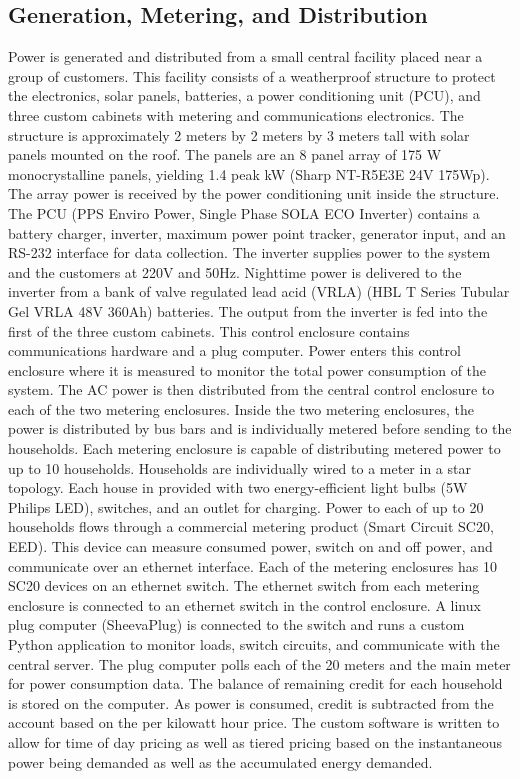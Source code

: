 \documentclass{sig-alternate}
\begin{document}
\subsection{Generation, Metering, and Distribution}
Power is generated and distributed from a small central facility placed
near a group of customers.
This facility consists of a weatherproof structure to protect the
electronics, solar panels, batteries, a power conditioning unit (PCU),
and three custom cabinets with metering and communications electronics.
The structure is approximately 2 meters by 2 meters by 3 meters tall
with solar panels mounted on the roof.
The panels are an 8 panel array of 175 W monocrystalline panels, yielding
1.4 peak kW (Sharp NT-R5E3E 24V 175Wp).
The array power is received by the power conditioning unit inside the
structure.
The PCU (PPS Enviro Power, Single Phase SOLA ECO Inverter) contains a
battery charger, inverter, maximum power point tracker, generator input,
and an RS-232 interface for data collection.
The inverter supplies power to the system and the customers at 220V and
50Hz.
Nighttime power is delivered to the inverter from a bank of valve
regulated lead acid (VRLA) (HBL T Series Tubular Gel VRLA 48V 360Ah)
batteries.
The output from the inverter is fed into the first of the three custom
cabinets.  This control enclosure contains communications hardware and a
plug computer.
Power enters this control enclosure
where it is measured to monitor the total power consumption of the
system.
The AC power is then distributed from the central control enclosure to
each of the two metering enclosures.
Inside the two metering enclosures, the power is distributed by bus bars
and is individually metered before sending to the households.
Each metering enclosure is capable of distributing metered power to up
to 10 households.
Households are individually wired to a meter in a star topology.
Each house in provided with two energy-efficient light bulbs (5W Philips
LED), switches, and an outlet for charging.
Power to each of up to 20 households flows through a commercial metering
product (Smart Circuit SC20, EED).
This device can measure consumed power, switch on and off power, and
communicate over an ethernet interface.
Each of the metering enclosures has 10 SC20 devices on an ethernet switch.
The ethernet switch from each metering enclosure is connected to an
ethernet switch in the control enclosure.
A linux plug computer (SheevaPlug) is connected to the switch and runs a
custom Python application to monitor loads, switch circuits, and
communicate with the central server.
The plug computer polls each of the 20 meters and the main meter for
power consumption data.
The balance of remaining credit for each household is stored on the computer.
As power is consumed, credit is subtracted from the account based on the
per kilowatt hour price.
The custom software is written to allow for time of day pricing as well
as tiered pricing based on the instantaneous power being demanded as
well as the accumulated energy demanded.
\end{document}
